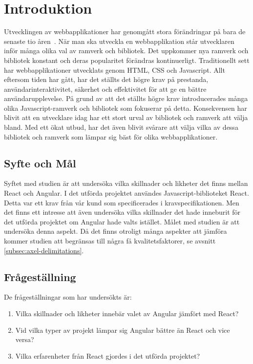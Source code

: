 \section{Introduktion}
\label{sec:axel-introduction}
Utvecklingen av webbapplikationer har genomgått stora förändringar på bara de senaste tio åren~\cite{changing}. När man ska utveckla en webbapplikation står utvecklaren inför många olika val av ramverk och bibliotek. Det uppkommer nya ramverk och bibliotek konstant och deras popularitet förändras kontinuerligt. Traditionellt sett har webbapplikationer utvecklats genom HTML, CSS och Javascript. Allt eftersom tiden har gått, har det ställts det högre krav på prestanda, användarinteraktivitet, säkerhet och effektivitet för att ge en bättre användarupplevelse. På grund av att det ställts högre krav introducerades många olika Javascript-ramverk och bibliotek som fokuserar på detta. Konsekvensen har blivit att en utvecklare idag har ett stort urval av bibliotek och ramverk att välja bland. Med ett ökat utbud, har det även blivit svårare att välja vilka av dessa bibliotek och ramverk som lämpar sig bäst för olika webbapplikationer.

\subsection{Syfte och Mål}
\label{subsec:axel-motivation}

Syftet med studien är att undersöka vilka skillnader och likheter det finns mellan React och Angular. I det utförda projektet användes Javascript-biblioteket React. Detta var ett krav från vår kund som specificerades i kravspecifikationen. Men det finns ett intresse att även undersöka vilka skillnader det hade inneburit för det utförda projektet om Angular hade valts istället. Målet med studien är att undersöka denna aspekt. Då det finns otroligt många aspekter att jämföra kommer studien att begränsas till några få kvalitetsfaktorer, se avsnitt \ref{subsec:axel-delimitations}.

\subsection{Frågeställning}
\label{subsec:axel-research-questions}

De frågeställningar som har undersökts är:

\begin{enumerate}
\item\label{axel-fs:1} Vilka skillnader och likheter innebär valet av Angular jämfört med React?

\item\label{axel-fs:2} Vid vilka typer av projekt lämpar sig Angular bättre än React och vice versa?

\item\label{axel-fs:3} Vilka erfarenheter från React gjordes i det utförda projektet?


\end{enumerate}


